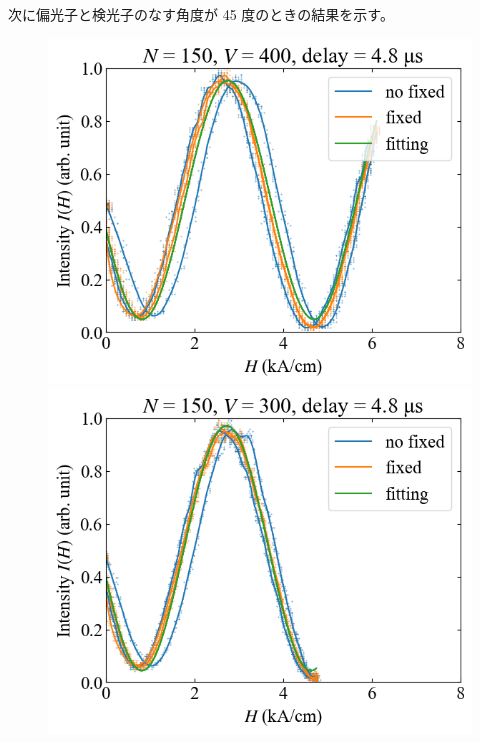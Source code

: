 \documentclass[9pt,dvipdfmx,a4paper]{jsarticle}
\begin{document}
次に偏光子と検光子のなす角度が 45 度のときの結果を示す。
\begin{figure}[H]
    \centering
    \begin{minipage}[t]{0.24\columnwidth}
        \centering
        \includegraphics[width = \columnwidth]{xy/17.png}
    \end{minipage}
    \hfill
    \begin{minipage}[t]{0.24\columnwidth}
        \centering
        \includegraphics[width = \columnwidth]{xy/18.png}
    \end{minipage}
    \hfill
    \begin{minipage}[t]{0.24\columnwidth}

\end{minipage}
\end{figure}
\end{document}
